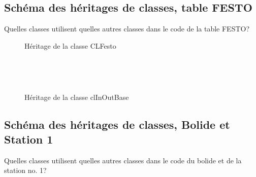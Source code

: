 \documentclass[10pt,a4paper,final]{article}
\begin{document}
\begin{spacing}{1.5}
\pagebreak
\subsection{Schéma des héritages de classes, table FESTO}
Quelles classes utilisent quelles autres classes dans le code de la table FESTO?
\begin{figure}[hbtp]
\caption{Héritage de la classe CLFesto}
\centering
{}\\
\caption{Héritage de la classe clInOutBase}
\\

\end{figure}
\pagebreak



\subsection{Schéma des héritages de classes, Bolide et Station 1}
Quelles classes utilisent quelles autres classes dans le code du bolide et de la station no. 1?


\end{spacing}
\end{document}
